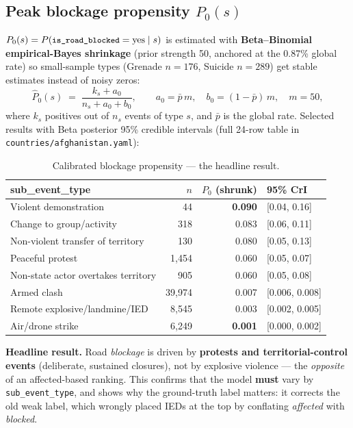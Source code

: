 \documentclass[11pt,a4paper]{article}
\newcommand{\code}[1]{\texttt{\small #1}}
\begin{document}
\subsection{Peak blockage propensity $P_0(s)$}

$P_0(s)=P(\code{is\_road\_blocked}=\text{yes}\mid s)$ is estimated with \textbf{Beta--Binomial
empirical-Bayes shrinkage} (prior strength 50, anchored at the 0.87\% global rate) so
small-sample types (Grenade $n{=}176$, Suicide $n{=}289$) get stable estimates instead of
noisy zeros:
\begin{equation}
\hat{P}_0(s) \;=\; \frac{k_s + a_0}{n_s + a_0 + b_0},
\qquad a_0 = \bar p\,m,\quad b_0=(1-\bar p)\,m,\quad m=50,
\end{equation}
where $k_s$ positives out of $n_s$ events of type $s$, and $\bar p$ is the global rate.
Selected results with Beta posterior 95\% credible intervals (full 24-row table in
\code{countries/afghanistan.yaml}):

\begin{table}[h]
\centering
\renewcommand{\arraystretch}{1.2}
\begin{tabular}{@{}l r r l@{}}
\toprule
\textbf{sub\_event\_type} & \textbf{$n$} & \textbf{$P_0$ (shrunk)} & \textbf{95\% CrI} \\
\midrule
Violent demonstration                 & 44       & \textbf{0.090} & [0.04, 0.16] \\
Change to group/activity              & 318      & 0.083 & [0.06, 0.11] \\
Non-violent transfer of territory     & 130      & 0.080 & [0.05, 0.13] \\
Peaceful protest                      & 1{,}454  & 0.060 & [0.05, 0.07] \\
Non-state actor overtakes territory   & 905      & 0.060 & [0.05, 0.08] \\
Armed clash                           & 39{,}974 & 0.007 & [0.006, 0.008] \\
Remote explosive/landmine/IED         & 8{,}545  & 0.003 & [0.002, 0.005] \\
Air/drone strike                      & 6{,}249  & \textbf{0.001} & [0.000, 0.002] \\
\bottomrule
\end{tabular}
\caption{Calibrated blockage propensity --- the headline result.}
\label{tab:p0}
\end{table}

\begin{notebox}
\textbf{Headline result.} Road \emph{blockage} is driven by \textbf{protests and
territorial-control events} (deliberate, sustained closures), not by explosive violence --- the
\emph{opposite} of an affected-based ranking. This confirms that the model \textbf{must} vary by
\code{sub\_event\_type}, and shows why the ground-truth label matters: it corrects the old weak
label, which wrongly placed IEDs at the top by conflating \emph{affected} with \emph{blocked}.
\end{notebox}
\end{document}
